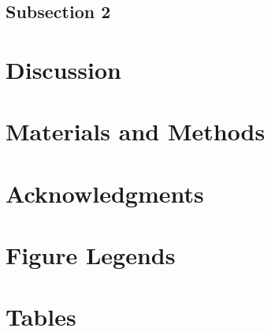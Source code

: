 \documentclass[10pt]{article}
\begin{document}
\subsection*{Subsection 2}

\section*{Discussion}
\cite{Mizuseki 2012}


\section*{Materials and Methods}

\section*{Acknowledgments}




\section*{Figure Legends}


\section*{Tables}
\end{document}
